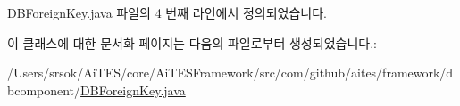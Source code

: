 D\+B\+Foreign\+Key.\+java 파일의 4 번째 라인에서 정의되었습니다.



이 클래스에 대한 문서화 페이지는 다음의 파일로부터 생성되었습니다.\+:\begin{DoxyCompactItemize}
\item 
/\+Users/srsok/\+Ai\+T\+E\+S/core/\+Ai\+T\+E\+S\+Framework/src/com/github/aites/framework/dbcomponent/\mbox{\hyperlink{_d_b_foreign_key_8java}{D\+B\+Foreign\+Key.\+java}}\end{DoxyCompactItemize}
